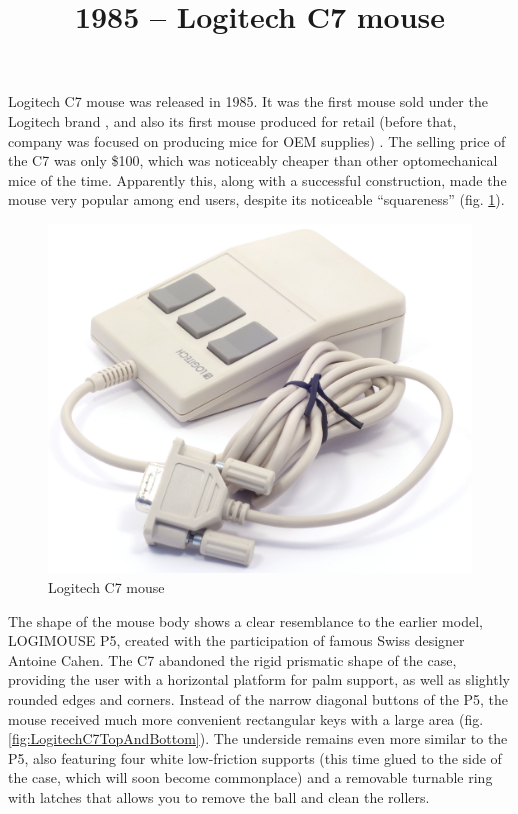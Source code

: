 \documentclass[11pt, a4paper]{article}
\begin{document}
\title{1985 -- Logitech C7 mouse}
\date{}
\maketitle
{}
Logitech C7 mouse was released in 1985. It was the first mouse sold under the Logitech brand \cite{timeline}, and also its first mouse produced for retail (before that, company was focused on producing mice for OEM supplies) \cite{history}.
The selling price of the C7 was only \$100, which was noticeably cheaper than other optomechanical mice of the time. Apparently this, along with a successful construction, made the mouse very popular among end users, despite its noticeable “squareness” (fig. \ref{fig:LogitechC7Pic}).

\begin{figure}[h]
   \centering
    \includegraphics[scale=0.5]{1985_logitech_c7_mouse/pic_60.jpg}
    \caption{Logitech C7 mouse}
    \label{fig:LogitechC7Pic}
\end{figure}

The shape of the mouse body shows a clear resemblance to the earlier model, LOGIMOUSE P5, created with the participation of famous Swiss designer Antoine Cahen. The C7 abandoned the rigid prismatic shape of the case, providing the user with a horizontal platform for palm support, as well as slightly rounded edges and corners. Instead of the narrow diagonal buttons of the P5, the mouse received much more convenient rectangular keys with a large area (fig. \ref{fig:LogitechC7TopAndBottom}). The underside remains even more similar to the P5, also featuring four white low-friction supports (this time glued to the side of the case, which will soon become commonplace) and a removable turnable ring with latches that allows you to remove the ball and clean the rollers.
\end{document}
